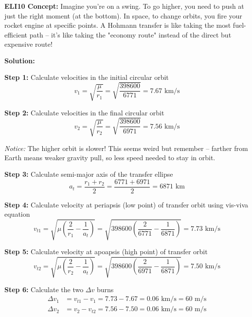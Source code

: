\documentclass[11pt,a4paper]{article}
\begin{document}
\textbf{ELI10 Concept:} Imagine you're on a swing. To go higher, you need to push at just the right moment (at the bottom). In space, to change orbits, you fire your rocket engine at specific points. A Hohmann transfer is like taking the most fuel-efficient path -- it's like taking the "economy route" instead of the direct but expensive route!

\textbf{Solution:}

\textbf{Step 1:} Calculate velocities in the initial circular orbit
\begin{equation}
v_1 = \sqrt{\frac{\mu}{r_1}} = \sqrt{\frac{398600}{6771}} = 7.67 \text{ km/s}
\end{equation}

\textbf{Step 2:} Calculate velocities in the final circular orbit
\begin{equation}
v_2 = \sqrt{\frac{\mu}{r_2}} = \sqrt{\frac{398600}{6971}} = 7.56 \text{ km/s}
\end{equation}

\textit{Notice:} The higher orbit is slower! This seems weird but remember -- farther from Earth means weaker gravity pull, so less speed needed to stay in orbit.

\textbf{Step 3:} Calculate semi-major axis of the transfer ellipse
\begin{equation}
a_t = \frac{r_1 + r_2}{2} = \frac{6771 + 6971}{2} = 6871 \text{ km}
\end{equation}

\textbf{Step 4:} Calculate velocity at periapsis (low point) of transfer orbit using vis-viva equation
\begin{equation}
v_{t1} = \sqrt{\mu\left(\frac{2}{r_1} - \frac{1}{a_t}\right)} = \sqrt{398600\left(\frac{2}{6771} - \frac{1}{6871}\right)} = 7.73 \text{ km/s}
\end{equation}

\textbf{Step 5:} Calculate velocity at apoapsis (high point) of transfer orbit
\begin{equation}
v_{t2} = \sqrt{\mu\left(\frac{2}{r_2} - \frac{1}{a_t}\right)} = \sqrt{398600\left(\frac{2}{6971} - \frac{1}{6871}\right)} = 7.50 \text{ km/s}
\end{equation}

\textbf{Step 6:} Calculate the two $\Delta v$ burns
\begin{align}
\Delta v_1 &= v_{t1} - v_1 = 7.73 - 7.67 = 0.06 \text{ km/s} = 60 \text{ m/s} \\
\Delta v_2 &= v_2 - v_{t2} = 7.56 - 7.50 = 0.06 \text{ km/s} = 60 \text{ m/s}
\end{align}
\end{document}
